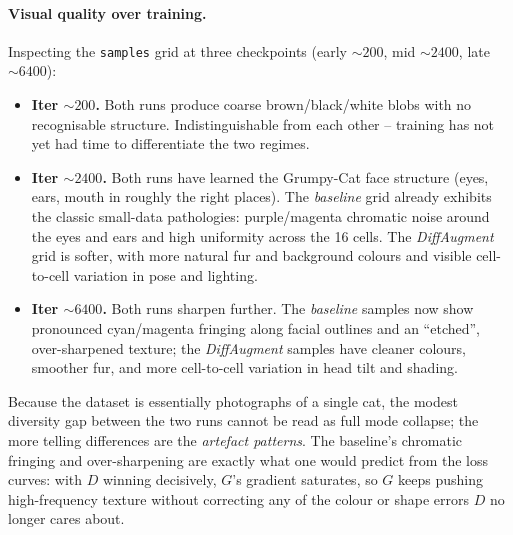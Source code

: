\documentclass[11pt,a4paper]{article}
\begin{document}
\paragraph{Visual quality over training.}
Inspecting the \texttt{samples} grid at three checkpoints (early
$\sim\!200$, mid $\sim\!2400$, late $\sim\!6400$):
\begin{itemize}[leftmargin=1.5em]
    \item \textbf{Iter $\sim\!200$.} Both runs produce coarse
          brown/black/white blobs with no recognisable structure.
          Indistinguishable from each other -- training has not yet
          had time to differentiate the two regimes.
    \item \textbf{Iter $\sim\!2400$.} Both runs have learned the
          Grumpy-Cat face structure (eyes, ears, mouth in roughly the
          right places). The \emph{baseline} grid already exhibits
          the classic small-data pathologies: purple/magenta
          chromatic noise around the eyes and ears and high
          uniformity across the 16 cells. The \emph{DiffAugment} grid
          is softer, with more natural fur and background colours
          and visible cell-to-cell variation in pose and lighting.
    \item \textbf{Iter $\sim\!6400$.} Both runs sharpen further. The
          \emph{baseline} samples now show pronounced cyan/magenta
          fringing along facial outlines and an ``etched'',
          over-sharpened texture; the \emph{DiffAugment} samples have
          cleaner colours, smoother fur, and more cell-to-cell
          variation in head tilt and shading.
\end{itemize}
Because the dataset is essentially photographs of a single cat, the
modest diversity gap between the two runs cannot be read as full mode
collapse; the more telling differences are the \emph{artefact
patterns}. The baseline's chromatic fringing and over-sharpening are
exactly what one would predict from the loss curves: with $D$ winning
decisively, $G$'s gradient saturates, so $G$ keeps pushing
high-frequency texture without correcting any of the colour or shape
errors $D$ no longer cares about.
\end{document}
